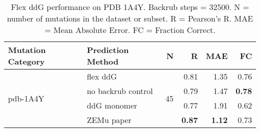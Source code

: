 \begin{table}
  \begin{tabular}{llrrrr}
\toprule
Mutation Category &   Prediction Method &   N &    R &  MAE &   FC \\
\midrule
 \multirow{ 4}{*}{pdb-1A4Y} & flex ddG & \multirow{ 4}{*}{45} & 0.81 & 1.35 & 0.76  \\
 & no backrub control & & 0.79 & 1.47 & \textbf{0.78}  \\
 & ddG monomer & & 0.77 & 1.91 & 0.62  \\
 & ZEMu paper & & \textbf{0.87} & \textbf{1.12} & 0.73  \\
\bottomrule
\end{tabular}
  \caption[Flex ddG performance on PDB 1A4Y]{
    Flex ddG performance on PDB 1A4Y. Backrub steps = 32500. N = number of mutations in the dataset or subset. R = Pearson's R. MAE = Mean Absolute Error. FC = Fraction Correct.
  } \label{tab:table-pdb-1A4Y}
\end{table}
